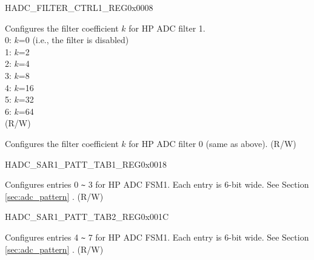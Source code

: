\begin{register}{H}{ADC\_FILTER\_CTRL1\_REG}{0x0008}\label{regdesc:ADCFILTERCTRL1REG}
%
%
%
\regnewline%
\begin{regdesc}\begin{reglist}
\label{fielddesc:ADCFILTERFACTOR1}\item [ADC\_FILTER\_FACTOR1]
Configures the filter coefficient \(k\) for HP ADC filter 1.\\
0: \(k\)=0 (i.e., the filter is disabled)\\
1: \(k\)=2\\
2: \(k\)=4\\
3: \(k\)=8\\
4: \(k\)=16\\
5: \(k\)=32\\
6: \(k\)=64\\
(R/W)
\label{fielddesc:ADCFILTERFACTOR0}\item [ADC\_FILTER\_FACTOR0]
Configures the filter coefficient \(k\) for HP ADC filter 0 (same as above). (R/W)
\end{reglist}\end{regdesc}
\end{register}


\begin{register}{H}{ADC\_SAR1\_PATT\_TAB1\_REG}{0x0018}\label{regdesc:ADCSAR1PATTTAB1REG}
%
%
\regnewline%
\begin{regdesc}\begin{reglist}
\label{fielddesc:ADCSAR1PATTTAB1}\item [ADC\_SAR1\_PATT\_TAB1] Configures entries 0 \verb+~+ 3 for HP ADC FSM1. Each entry is 6-bit wide. See Section \ref{sec:adc_pattern} \textit{}. (R/W)
\end{reglist}\end{regdesc}
\end{register}


\begin{register}{H}{ADC\_SAR1\_PATT\_TAB2\_REG}{0x001C}\label{regdesc:ADCSAR1PATTTAB2REG}
%
%
\regnewline%
\begin{regdesc}\begin{reglist}
\label{fielddesc:ADCSAR1PATTTAB2}\item [ADC\_SAR1\_PATT\_TAB2] Configures entries 4 \verb+~+ 7 for HP ADC FSM1. Each entry is 6-bit wide. See Section \ref{sec:adc_pattern} \textit{}. (R/W)
\end{reglist}\end{regdesc}
\end{register}


